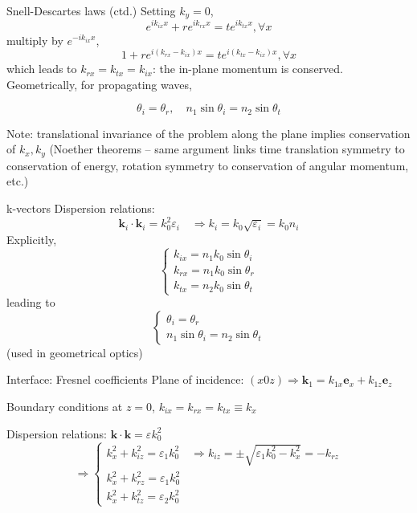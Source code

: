 \documentclass{article}
\begin{document}
\begin{frame}{Snell-Descartes laws (ctd.)}
\protect\hypertarget{snell-descartes-laws-ctd.}{}
Setting \(k_y=0\), \[
e^{i {k_{ix}x}} + r e^{i{k_{rx}x}} = t e^{i{k_{tx}x}}, \forall x
\] multiply by \(e^{-i {k_{ix}x}}\), \[
1 + r e^{i{(k_{rx}-k_{ix})x}} = t e^{i{(k_{tx}-k_{ix})x}}, \forall x
\] which leads to \(k_{rx}=k_{tx}=k_{ix}\): the in-plane momentum is
conserved. Geometrically, for propagating waves,

\[
\theta_i = \theta_r,\quad n_1\sin \theta_i=n_2\sin \theta_t
\]

Note: translational invariance of the problem along the plane implies
conservation of \(k_{x}, k_{y}\) (Noether theorems -- same argument
links time translation symmetry to conservation of energy, rotation
symmetry to conservation of angular momentum, etc.)
\end{frame}

\begin{frame}{k-vectors}
\protect\hypertarget{k-vectors}{}
Dispersion relations: \[
\mathbf{k}_{i} \cdot \mathbf{k}_{i}=k_{0}^{2} \varepsilon_{i} \quad \Rightarrow k_{i}=k_{0} \sqrt{\varepsilon_{i}}=k_{0} n_{i}
\] Explicitly, \[
\left\{\begin{array}{l}k_{i x}=n_{1} k_{0} \sin \theta_{i} \\ k_{r x}=n_{1} k_{0} \sin \theta_{r} \\ k_{t x}=n_{2} k_{0} \sin \theta_{t}\end{array}\right.
\] leading to \[
\left\{\begin{array}{c}\theta_{i}=\theta_{r} \\ n_{1} \sin \theta_{i}=n_{2} \sin \theta_{t}\end{array}\right.
\] (used in geometrical optics)
\end{frame}

\begin{frame}{Interface: Fresnel coefficients}
\protect\hypertarget{interface-fresnel-coefficients}{}
Plane of incidence:
\((x 0 z) \Rightarrow \mathbf{k}_{1}=k_{1 x} \mathbf{e}_{x}+k_{1 z} \mathbf{e}_{z}\)

Boundary conditions at \(z=0\), \(k_{i x}=k_{r x}=k_{t x} \equiv k_{x}\)

Dispersion relations:
\(\mathbf{k} \cdot \mathbf{k}=\varepsilon k_{0}^{2}\) \[
\Rightarrow \left\{\begin{array}{l}
k_{x}^{2}+k_{i z}^{2}=\varepsilon_{1} k_{0}^{2} \quad \Rightarrow k_{i z}=\pm \sqrt{\varepsilon_{1} k_{0}^{2}-k_{x}^{2}}=-k_{r z} \\
k_{x}^{2}+k_{r z}^{2}=\varepsilon_{1} k_{0}^{2} \\
k_{x}^{2}+k_{t z}^{2}=\varepsilon_{2} k_{0}^{2}
\end{array}\right.
\]
\end{frame}
\end{document}

